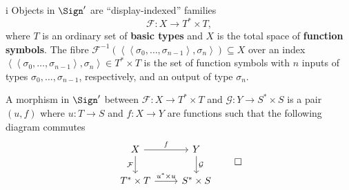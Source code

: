 \begin{partsolution}{i}
Objects in \(\Sign^\prime\) are ``display-indexed'' families
\begin{equation*}
\mathcal{F} : X \to T^* \times T,
\end{equation*}
where \(T\) is an ordinary set of \textbf{basic types} and \(X\) is the total space of \textbf{function symbols}.
The fibre \(\mathcal{F}^{-1}\left(\left\langle\left\langle\sigma_0,\ldots,\sigma_{n-1}\right\rangle,\sigma_n\right\rangle\right) \subseteq X\) over an index \(\left\langle\left\langle\sigma_0,\ldots,\sigma_{n-1}\right\rangle,\sigma_n\right\rangle \in T^* \times T\) is the set of function symbols with \(n\) inputs of types \(\sigma_0, \ldots, \sigma_{n-1}\), respectively, and an output of type \(\sigma_n\).

A morphism in \(\Sign^\prime\) between \(\mathcal{F} : X \to T^* \times T\) and \(\mathcal{G} : Y \to S^* \times S\) is a pair \((u, f)\) where \(u : T \to S\) and \(f : X \to Y\) are functions such that the following diagram commutes
\begin{equation*}
\begin{tikzcd}
X \arrow[r, "f"] \arrow[d, "\mathcal{F}"{left}]
& Y \arrow[d, "\mathcal{G}"{right}] \\
T^* \times T \arrow[r, "u^* \times u"]
& S^* \times S
\end{tikzcd}
\qedhere
\end{equation*}


\end{partsolution}